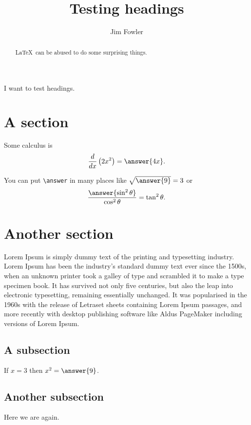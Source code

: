 \documentclass{ximera}
\title{Testing headings}
\author{Jim Fowler}
\begin{document}
\begin{abstract}
  \LaTeX\ can be abused to do some surprising things.
\end{abstract}

\maketitle

I want to test headings.

\section{A section}

\begin{problem}
  Some calculus is
  \[
    \frac{d}{dx} \left( 2x^2 \right) = \answer{4x}.
  \]

  You can put \verb|\answer| in many places
    like \(\sqrt{\answer{9}} = 3\)
    or \[
      \frac{\answer{\sin^2 \theta}}{\cos^2 \theta} = \tan^2 \theta.
    \]
\end{problem}

\section{Another section}

Lorem Ipsum is simply dummy text of the printing and typesetting industry. Lorem Ipsum has been the industry's standard dummy text ever since the 1500s, when an unknown printer took a galley of type and scrambled it to make a type specimen book. It has survived not only five centuries, but also the leap into electronic typesetting, remaining essentially unchanged. It was popularised in the 1960s with the release of Letraset sheets containing Lorem Ipsum passages, and more recently with desktop publishing software like Aldus PageMaker including versions of Lorem Ipsum.

\subsection{A subsection}

\begin{problem}
  If $x = 3$ then $x^2 = \answer{9}$.
\end{problem}

\subsection{Another subsection}

Here we are again.
\end{document}
